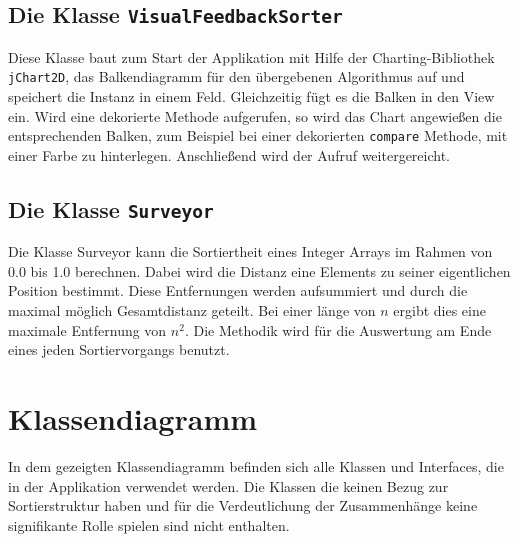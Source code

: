 \subsection{Die Klasse \texttt{VisualFeedbackSorter}}
Diese Klasse baut zum Start der Applikation mit Hilfe der Charting-Bibliothek \newline \texttt{jChart2D}, 
das Balkendiagramm für den übergebenen Algorithmus auf und speichert
die Instanz in einem Feld. Gleichzeitig fügt es die Balken in den View ein. Wird eine dekorierte Methode
aufgerufen, so wird das Chart angewießen die entsprechenden Balken, zum Beispiel bei einer dekorierten \texttt{compare} Methode, mit einer Farbe zu hinterlegen.
Anschließend wird der Aufruf weitergereicht.

\subsection{Die Klasse \texttt{Surveyor}}
Die Klasse Surveyor kann die Sortiertheit eines Integer Arrays im Rahmen von 
0.0 bis 1.0 berechnen. Dabei wird die Distanz eine Elements zu seiner eigentlichen Position bestimmt. Diese Entfernungen werden aufsummiert 
und durch die maximal möglich Gesamtdistanz geteilt. Bei einer länge von $n$ ergibt dies eine maximale Entfernung von $n^2$.
Die Methodik wird für die Auswertung am Ende eines jeden Sortiervorgangs benutzt.

\section{Klassendiagramm}
In dem gezeigten Klassendiagramm befinden sich alle Klassen und Interfaces, die in der Applikation verwendet werden.
Die Klassen die keinen Bezug zur Sortierstruktur haben und für die Verdeutlichung der Zusammenhänge keine signifikante Rolle spielen sind nicht enthalten.
